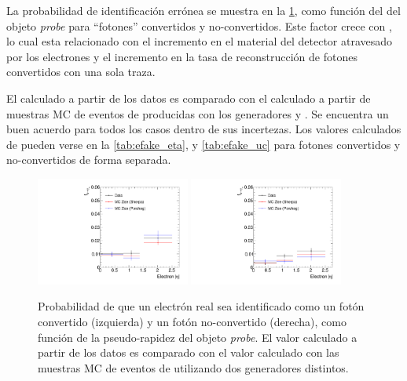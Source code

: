 La probabilidad de identificación errónea se muestra en la \cref{fig:efake_eta},
como función del {\abseta} del objeto \emph{probe} para ``fotones'' convertidos
y no-convertidos. Este factor crece con {\abseta}, lo cual esta relacionado
con el incremento en el material del detector atravesado por los electrones y el
incremento en la tasa de reconstrucción de fotones convertidos con una sola
traza.

El {\feg} calculado a partir de los datos es comparado con el calculado a partir
de muestras MC de eventos de {\Zee} producidas con los generadores {\sherpa} y
{\powheg}. Se encuentra un buen acuerdo para todos los casos dentro de sus incertezas.
Los valores calculados de {\feg} pueden verse en la \cref{tab:efake_eta}, y \cref{tab:efake_uc} para fotones
convertidos y no-convertidos de forma separada.

\begin{figure}[!htbp]
  \centering

  \includegraphics[width=0.45\textwidth]{figures/fegc_feta}
  \includegraphics[width=0.45\textwidth]{figures/fegu_feta}

  \caption{Probabilidad de que un electrón real sea identificado como un fotón convertido (izquierda)
    y un fotón no-convertido (derecha), como función de la pseudo-rapidez del objeto \emph{probe}. El valor
    calculado a partir de los datos es comparado con el valor calculado con las muestras MC de eventos de {\Zee} utilizando
    dos generadores distintos.}
  \label{fig:efake_eta}
\end{figure}


